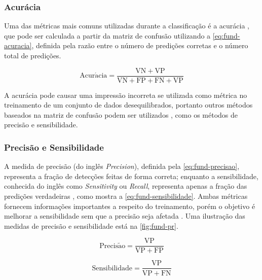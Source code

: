 \subsubsection{Acurácia} \label{cap:fund-ia-metricas-acuracia}
Uma das métricas mais comuns utilizadas durante a classificação é a acurácia \cite{ref:Batarseh-Yang}, que pode ser calculada a partir da matriz de confusão utilizando a \autoref{eq:fund-acuracia}, definida pela razão entre o número de predições corretas e o número total de predições.

\begin{equation} \label{eq:fund-acuracia}
\mathrm{
  Acur\acute{a}cia = \frac{VN + VP}{VN + FP + FN + VP}
}
\end{equation}

A acurácia pode causar uma impressão incorreta se utilizada como métrica no treinamento de um conjunto de dados desequilibrados, portanto outros métodos baseados na matriz de confusão podem ser utilizados \cite{ref:Batarseh-Yang}, como os métodos de precisão e sensibilidade.

\subsubsection{Precisão e Sensibilidade} \label{cap:fund-ia-metricas-pr}

A medida de precisão (do inglês \textit{Precision}), definida pela \autoref{eq:fund-precisao}, representa a fração de detecções feitas de forma correta; enquanto a sensibilidade, conhecida do inglês como \textit{Sensitivity} ou \textit{Recall}, representa apenas a fração das predições verdadeiras \cite{ref:Goodfellow-Bengio-Courville}, como mostra a \autoref{eq:fund-sensibilidade}. Ambas métricas fornecem informações importantes a respeito do treinamento, porém o objetivo é melhorar a sensibilidade sem que a precisão seja afetada . Uma ilustração das medidas de precisão e sensibilidade está na \autoref{fig:fund-pr}.

\begin{equation} \label{eq:fund-precisao}
\mathrm{
  Precis\tilde{a}o = \frac{VP}{VP + FP}
}
\end{equation}

\begin{equation} \label{eq:fund-sensibilidade}
\mathrm{
  Sensibilidade = \frac{VP}{VP + FN}
}
\end{equation}

